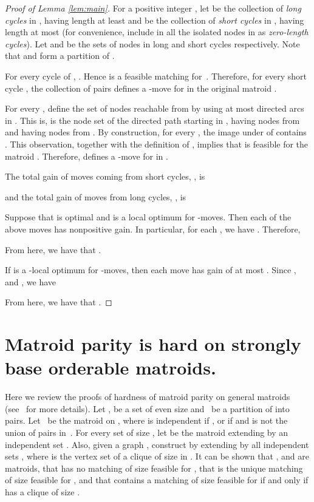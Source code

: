 \documentclass[letterpaper,11pt]{article}
\theoremstyle{definition}
\begin{document}
\begin{proof}[Proof of Lemma \ref{lem:main}]
For a positive integer , let  be the collection of \emph{long cycles} in , having length at least  and  be the collection of \emph{short cycles} in , having length at most  (for convenience, include in  all the isolated nodes in  as \emph{zero-length cycles}). Let  and  be the sets of nodes in long and short cycles respectively. Note that  and  form a partition of .

For every cycle  of , . Hence  is a feasible matching for~. Therefore, for every short cycle , the collection of pairs  defines a -move for  in the original matroid .

For every , define the set  of nodes reachable from  by using at most  directed arcs in . This is,  is the node set of the directed path starting in , having  nodes from~ and having  nodes from . By construction, for every , the image under  of  contains . This observation, together with the definition of , implies that  is feasible for the matroid . Therefore,  defines a -move for  in .

The total gain of moves coming from short cycles, , is

and the total gain of moves from long cycles, , is


Suppose that  is optimal and  is a local optimum for -moves. Then each of the above moves has nonpositive gain. In particular, for each , we have . Therefore,

From here, we have that .

If  is a -local optimum for -moves, then each move has gain of at most . Since ,  and , we have

From here, we have that . \qedhere\end{proof}

\section{Matroid parity is hard on strongly base orderable matroids.}
Here we review the proofs of hardness of matroid parity on general matroids (see~\cite[Section 43.9]{Schrijver-book} for more details).
Let ,  be a set of even size and~ be a partition of  into pairs. Let ~be the matroid on , where  is independent if , or if  and  is not the union of  pairs in~. For every set  of size , let  be the matroid extending  by an independent set . Also, given a graph , construct  by extending  by all independent sets , where  is the vertex set of a clique of size  in . It can be shown that ,  and  are matroids, that  has no matching of size  feasible for , that  is the unique matching of size  feasible for , and that  contains a matching of size  feasible for  if and only if  has a clique of size .
\end{document}
